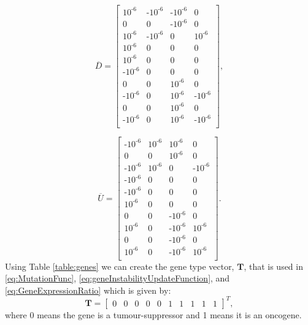 \documentclass[\main/thesis.tex]{subfiles}
\begin{document}
\begin{equation}
\overline{D} {=}
\begin{bmatrix}
	10^{\text{-}6} & \text{-}10^{\text{-}6} & \text{-}10^{\text{-}6} & 0 \\
	0 & 0 & \text{-}10^{\text{-}6} & 0 \\
	10^{\text{-}6} & \text{-}10^{\text{-}6} & 0 & 10^{\text{-}6} \\
	10^{\text{-}6} & 0 & 0 & 0 \\
	10^{\text{-}6} & 0 & 0 & 0 \\
	\text{-}10^{\text{-}6} & 0 & 0 & 0 \\
	0 & 0 & 10^{\text{-}6} & 0 \\
	\text{-}10^{\text{-}6} & 0 & 10^{\text{-}6} & \text{-}10^{\text{-}6} \\
	0 & 0 & 10^{\text{-}6} & 0 \\
	\text{-}10^{\text{-}6} & 0 & 10^{\text{-}6} & \text{-}10^{\text{-}6} \\
\end{bmatrix},
\label{param:D}
\end{equation}

\begin{equation}
    \overline{U} {=}
\begin{bmatrix}
	\text{-}10^{\text{-}6} & 10^{\text{-}6} & 10^{\text{-}6} & 0 \\
	0 & 0 & 10^{\text{-}6} & 0 \\
	\text{-}10^{\text{-}6} & 10^{\text{-}6} & 0 & \text{-}10^{\text{-}6} \\
	\text{-}10^{\text{-}6} & 0 & 0 & 0 \\
	\text{-}10^{\text{-}6} & 0 & 0 & 0 \\
	10^{\text{-}6} & 0 & 0 & 0 \\
	0 & 0 & \text{-}10^{\text{-}6} & 0 \\
	10^{\text{-}6} & 0 & \text{-}10^{\text{-}6} & 10^{\text{-}6} \\
	0 & 0 & \text{-}10^{\text{-}6} & 0 \\
	10^{\text{-}6} & 0 & \text{-}10^{\text{-}6} & 10^{\text{-}6} \\
\end{bmatrix}.
\label{param:U}
\end{equation}
Using Table \ref{table:genes} we can create the gene type vector, $\boldsymbol{T}$, that is used in \eqref{eq:MutationFunc}, \eqref{eq:geneInstabilityUpdateFunction}, and \eqref{eq:GeneExpressionRatio} which is given by:
\begin{equation}
    \boldsymbol{T} {=}
    \begin{bmatrix}
        0 & 0 & 0 & 0 & 0 & 1 & 1 & 1 & 1 & 1
    \end{bmatrix}^T,
    \label{param:T}
\end{equation}
where 0 means the gene is a tumour-suppressor and 1 means it is an oncogene.
\end{document}
